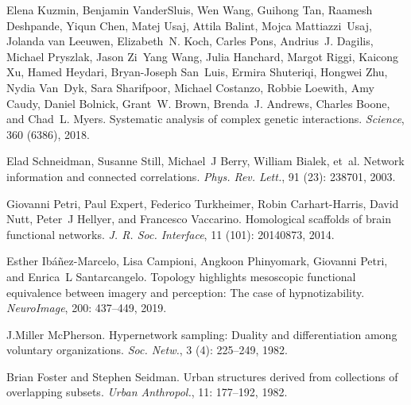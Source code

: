 Elena Kuzmin, Benjamin VanderSluis, Wen Wang, Guihong Tan, Raamesh Deshpande,
Yiqun Chen, Matej Usaj, Attila Balint, Mojca Mattiazzi~Usaj, Jolanda {van
    Leeuwen}, Elizabeth~N. Koch, Carles Pons, Andrius~J. Dagilis, Michael
Pryszlak, Jason Zi~Yang Wang, Julia Hanchard, Margot Riggi, Kaicong Xu, Hamed
Heydari, Bryan-Joseph San~Luis, Ermira Shuteriqi, Hongwei Zhu, Nydia Van~Dyk,
Sara Sharifpoor, Michael Costanzo, Robbie Loewith, Amy Caudy, Daniel Bolnick,
Grant~W. Brown, Brenda~J. Andrews, Charles Boone, and Chad~L. Myers.
\newblock Systematic analysis of complex genetic interactions.
\newblock \emph{Science}, 360 (6386), 2018.

Elad Schneidman, Susanne Still, Michael~J Berry, William Bialek, et~al.
\newblock Network information and connected correlations.
\newblock \emph{Phys. Rev. Lett.}, 91 (23): 238701, 2003.

Giovanni Petri, Paul Expert, Federico Turkheimer, Robin {Carhart-Harris}, David
Nutt, Peter~J Hellyer, and Francesco Vaccarino.
\newblock Homological scaffolds of brain functional networks.
\newblock \emph{J. R. Soc. Interface}, 11 (101): 20140873,
2014.

Esther {Ib{\'a}{\~n}ez-Marcelo}, Lisa Campioni, Angkoon Phinyomark, Giovanni
Petri, and Enrica~L Santarcangelo.
\newblock Topology highlights mesoscopic functional equivalence between imagery
and perception: {{The}} case of hypnotizability.
\newblock \emph{NeuroImage}, 200: 437--449, 2019{}.

J.Miller McPherson.
\newblock Hypernetwork sampling: {{Duality}} and differentiation among
voluntary organizations.
\newblock \emph{Soc. Netw.}, 3 (4): 225--249, 1982.

Brian Foster and Stephen Seidman.
\newblock Urban structures derived from collections of overlapping subsets.
\newblock \emph{Urban Anthropol.}, 11: 177--192, 1982.

